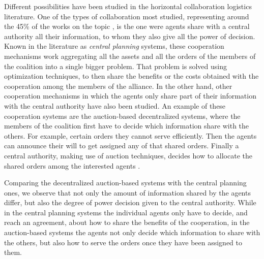 \documentclass[authoryear]{elsarticle}
\begin{document}
Different possibilities have been studied in the horizontal collaboration logistics literature. One of the types of collaboration most studied, representing around the 45\% of the works on the topic \citep{GANTERER2017}, is the one were agents share with a central authority all their information, to whom they also give all the power of decision. Known in the literature as \emph{central planning} systems, these cooperation mechanisms work aggregating all the assets and all the orders of the members of the coalition into a single bigger problem. That problem is solved using optimization techniques, to then share the benefits or the costs obtained with the cooperation among the members of the alliance. In the other hand, other cooperation mechanisms in which the agents only share part of their information with the central authority have also been studied. An example of these cooperation systems are the auction-based decentralized systems, where the members of the coalition first have to decide which information share with the others. For example, certain orders they cannot serve efficiently. Then the agents can announce their will to get assigned any of that shared orders. Finally a central authority, making use of auction techniques, decides how to allocate the shared orders among the interested agents \citep{VERDONCK2013}. 

Comparing the decentralized auction-based systems with the central planning ones, we observe that not only the amount of information shared by the agents differ, but also the degree of power decision given to the central authority. While in the central planning systems the individual agents only have to decide, and reach an agreement, about how to share the benefits of the cooperation, in the auction-based systems the agents not only decide which information to share with the others, but also how to serve the orders once they have been assigned to them. 
\end{document}
